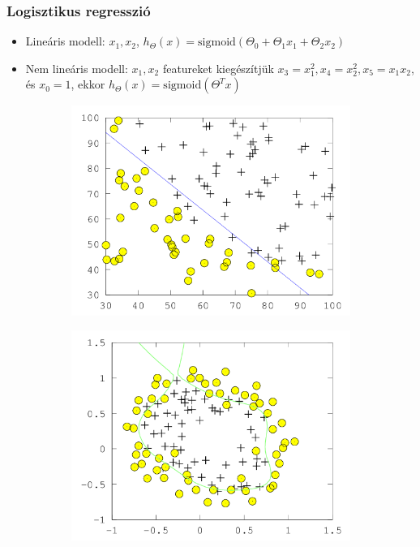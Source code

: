 \documentclass{beamer}
\begin{document}
\begin{frame}
\frametitle{Logisztikus regresszió}
\begin{itemize}
  \setlength{\itemsep}{12pt}
  \item Lineáris modell: $x_1, x_2$, $h_\Theta(x) = \mathrm{sigmoid}(\Theta_0+\Theta_1x_1+\Theta_2x_2)$
  \item Nem lineáris modell: $x_1, x_2$ featureket kiegészítjük $x_3=x_1^2, x_4=x_2^2, x_5=x_1x_2$, és $x_0=1$, ekkor $h_\Theta(x)=\mathrm{sigmoid}(\Theta^T x)$
\end{itemize}
\begin{figure}[H]
	\centering
    \begin{subfigure}[b]{0.49\textwidth}
    		\includegraphics[width=\textwidth]{pic/nn/3}
	\end{subfigure}
	\begin{subfigure}[b]{0.49\textwidth}
        	\includegraphics[width=\textwidth]{pic/nn/4}
	\end{subfigure}
\end{figure}
\end{frame}
\end{document}
